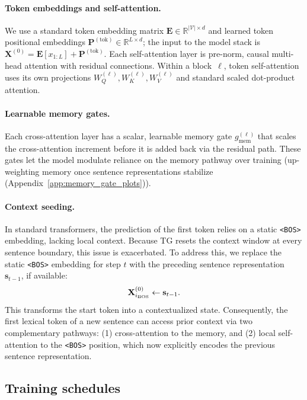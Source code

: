 \documentclass{article}
\begin{document}
\paragraph{Token embeddings and self-attention.}
We use a standard token embedding matrix $\mathbf{E}\!\in\!\mathbb{R}^{|\mathcal{V}|\times d}$ and learned token positional embeddings $\mathbf{P}^{(\text{tok})}\!\in\!\mathbb{R}^{L\times d}$; the input to the model stack is $\mathbf{X}^{(0)}=\mathbf{E}[x_{1:L}]+\mathbf{P}^{(\text{tok})}$.
Each self-attention layer is pre-norm, causal multi-head attention with residual connections.
Within a block~$\ell$, token self-attention uses its own projections $W_Q^{(\ell)},W_K^{(\ell)},W_V^{(\ell)}$ and standard scaled dot-product attention.

\paragraph{Learnable memory gates.}
Each cross-attention layer has a scalar, learnable memory gate $g_{\text{mem}}^{(\ell)}$ that scales the cross-attention increment before it is added back via the residual path.
These gates let the model modulate reliance on the memory pathway over training (up-weighting memory once sentence representations stabilize (Appendix~\ref{app:memory_gate_plots})). 


\paragraph{Context seeding.}
In standard transformers, the prediction of the first token relies on a static \texttt{<BOS>} embedding, lacking local context. Because TG resets the context window at every sentence boundary, this issue is exacerbated.
To address this, we replace the static \texttt{<BOS>} embedding for step $t$ with the preceding sentence representation $\mathbf{s}_{t-1}$, if available:
\vspace{0.2cm}
\[
\mathbf{X}^{(0)}_{i_{\text{BOS}}} \leftarrow \mathbf{s}_{t-1}.
\vspace{0.2cm}
\]
This transforms the start token into a contextualized state. Consequently, the first lexical token of a new sentence can access prior context via two complementary pathways: (1) cross-attention to the memory, and (2) local self-attention to the \texttt{<BOS>} position, which now explicitly encodes the previous sentence representation.



\subsection{Training schedules}
\label{sec:training-schedules}
\end{document}
